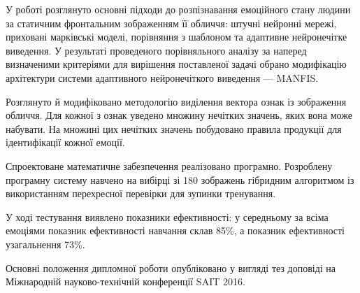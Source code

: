 \conclusions


У роботі розглянуто основні підходи до розпізнавання емоційного стану людини за
статичним фронтальним зображенням її обличчя: штучні нейронні мережі, приховані
марківські моделі, порівняння з шаблоном та адаптивне нейронечітке виведення. У
результаті проведеного порівняльного аналізу за наперед визначеними критеріями
для вирішення поставленої задачі обрано модифікацію архітектури системи
адаптивного нейронечіткого виведення --- MANFIS.

Розглянуто й модифіковано методологію виділення вектора ознак із зображення
обличчя. Для кожної з ознак уведено множину нечітких значень, яких вона може
набувати. На множині цих нечітких значень побудовано правила продукції для
ідентифікації кожної емоції.

Спроектоване математичне забезпечення реалізовано програмно. Розроблену
програмну систему навчено на вибірці зі 180 зображень гібридним алгоритмом із
використанням перехресної перевірки для зупинки тренування.

У ході тестування виявлено показники ефективності: у середньому за всіма
емоціями показник ефективності навчання склав 85\%, а показник ефективності
узагальнення 73\%.

Основні положення дипломної роботи опубліковано у вигляді тез доповіді на
Міжнародній науково-технічній конференції SAIT 2016.
